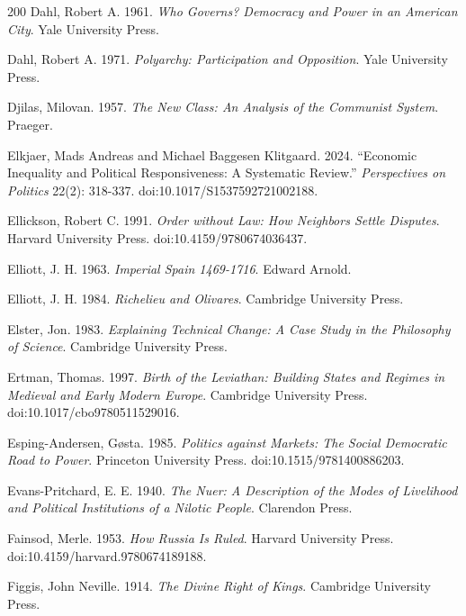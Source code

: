 \documentclass[11pt,letterpaper]{article}
\theoremstyle{definition}
\theoremstyle{remark}
\begin{document}
\begin{thebibliography}{200}
Dahl, Robert A. 1961. \emph{Who Governs? Democracy and Power in an American City}. Yale University Press.

Dahl, Robert A. 1971. \emph{Polyarchy: Participation and Opposition}. Yale University Press.

Djilas, Milovan. 1957. \emph{The New Class: An Analysis of the Communist System}. Praeger.

Elkjaer, Mads Andreas and Michael Baggesen Klitgaard. 2024. ``Economic Inequality and Political Responsiveness: A Systematic Review.'' \emph{Perspectives on Politics} 22(2): 318-337. doi:10.1017/S1537592721002188.

Ellickson, Robert C. 1991. \emph{Order without Law: How Neighbors Settle Disputes}. Harvard University Press. doi:10.4159/9780674036437.

Elliott, J. H. 1963. \emph{Imperial Spain 1469-1716}. Edward Arnold.

Elliott, J. H. 1984. \emph{Richelieu and Olivares}. Cambridge University Press.

Elster, Jon. 1983. \emph{Explaining Technical Change: A Case Study in the Philosophy of Science}. Cambridge University Press.

Ertman, Thomas. 1997. \emph{Birth of the Leviathan: Building States and Regimes in Medieval and Early Modern Europe}. Cambridge University Press. doi:10.1017/cbo9780511529016.

Esping-Andersen, G{\o}sta. 1985. \emph{Politics against Markets: The Social Democratic Road to Power}. Princeton University Press. doi:10.1515/9781400886203.

Evans-Pritchard, E. E. 1940. \emph{The Nuer: A Description of the Modes of Livelihood and Political Institutions of a Nilotic People}. Clarendon Press.

Fainsod, Merle. 1953. \emph{How Russia Is Ruled}. Harvard University Press. doi:10.4159/harvard.9780674189188.

Figgis, John Neville. 1914. \emph{The Divine Right of Kings}. Cambridge University Press.


\end{thebibliography}
\end{document}
